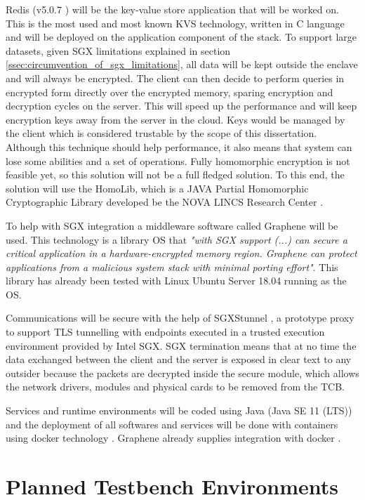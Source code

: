 Redis (v5.0.7 \cite{redis:1}) will be the key-value store application that will be worked on. This is the most used and most known \gls{KVS} technology, written in C language and will be deployed on the application component of the stack. To support large datasets, given \gls{SGX} limitations explained in section \ref{ssec:circumvention_of_sgx_limitations}, all data will be kept outside the enclave and will always be encrypted. The client can then decide to perform queries in encrypted form directly over the encrypted memory, sparing encryption and decryption cycles on the server. This will speed up the performance and will keep encryption keys away from the server in the cloud. Keys would be managed by the client which is considered trustable by the scope of this dissertation. Although this technique should help performance, it also means that system can lose some abilities and a set of operations. Fully homomorphic encryption is not feasible yet, so this solution will not be a full fledged solution. To this end, the solution will use the HomoLib, which is a JAVA Partial Homomorphic Cryptographic Library developed be the NOVA LINCS Research Center \cite{homolib:1}.

To help with \gls{SGX} integration a middleware software called Graphene \cite{graphene:1, graphene:2} will be used. This technology is a library \gls{OS} that \textit{"with \gls{SGX} support (...) can secure a critical application in a hardware-encrypted memory region. Graphene can protect applications from a malicious system stack with minimal porting effort"}. This library has already been tested with Linux Ubuntu Server 18.04 running as the \gls{OS}. 

Communications will be secure with the help of SGXStunnel \cite{sgxstunnel:1}, a prototype proxy to support TLS tunnelling with endpoints executed in a trusted execution environment provided by Intel SGX. \gls{SGX} termination means that at no time the data exchanged between the client and the server is exposed in clear text to any outsider because the packets are decrypted inside the secure module, which allows the network drivers, modules and physical cards to be removed from the \gls{TCB}.

Services and runtime environments will be coded using Java (Java SE 11 (LTS)) and the deployment of all softwares and services will be done with containers using docker technology \cite{docker:1}. Graphene already supplies integration with docker \cite{graphene_container:1}.

\section{Planned Testbench Environments} %
\label{sec:planned_testbench_environments}

